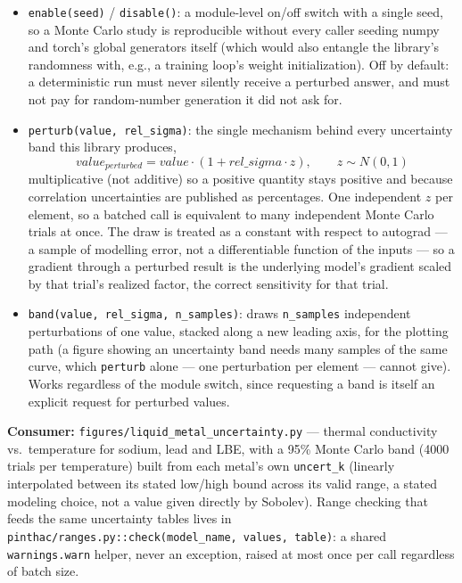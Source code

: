 \documentclass[11pt]{article}
\newcommand{\code}[1]{\texttt{#1}}
\begin{document}
\begin{itemize}
  \item \code{enable(seed)} / \code{disable()}: a module-level on/off switch with a
    single seed, so a Monte Carlo study is reproducible without every caller seeding
    numpy and torch's global generators itself (which would also entangle the
    library's randomness with, e.g., a training loop's weight initialization). Off by
    default: a deterministic run must never silently receive a perturbed answer, and
    must not pay for random-number generation it did not ask for.
  \item \code{perturb(value, rel\_sigma)}: the single mechanism behind every
    uncertainty band this library produces,
    \[
      value_{perturbed} = value\cdot(1+rel\_sigma\cdot z), \qquad z\sim N(0,1)
    \]
    multiplicative (not additive) so a positive quantity stays positive and because
    correlation uncertainties are published as percentages. One independent $z$ per
    element, so a batched call is equivalent to many independent Monte Carlo trials at
    once. The draw is treated as a constant with respect to autograd --- a sample of
    modelling error, not a differentiable function of the inputs --- so a gradient
    through a perturbed result is the underlying model's gradient scaled by that trial's
    realized factor, the correct sensitivity for that trial.
  \item \code{band(value, rel\_sigma, n\_samples)}: draws \code{n\_samples} independent
    perturbations of one value, stacked along a new leading axis, for the plotting path
    (a figure showing an uncertainty band needs many samples of the same curve, which
    \code{perturb} alone --- one perturbation per element --- cannot give). Works
    regardless of the module switch, since requesting a band is itself an explicit
    request for perturbed values.
\end{itemize}

\textbf{Consumer:} \code{figures/liquid\_metal\_uncertainty.py} --- thermal conductivity
vs.\ temperature for sodium, lead and LBE, with a 95\% Monte Carlo band (4000 trials per
temperature) built from each metal's own \code{uncert\_k} (linearly interpolated between
its stated low/high bound across its valid range, a stated modeling choice, not a value
given directly by Sobolev). Range checking that feeds the same uncertainty tables lives
in \code{pinthac/ranges.py::check(model\_name, values, table)}: a shared
\code{warnings.warn} helper, never an exception, raised at most once per call regardless
of batch size.
\end{document}
